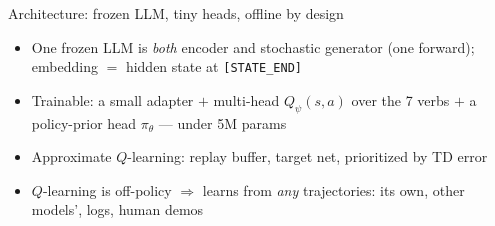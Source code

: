 \documentclass[aspectratio=169]{beamer}
\newcommand{\pitheta}{\pi_\theta}
\newcommand{\Qpsi}{Q_\psi}
\newcommand{\verbword}[1]{\texttt{#1}}
\begin{document}
\begin{frame}{Architecture: frozen LLM, tiny heads, offline by design}
  \begin{itemize}
    \item One frozen LLM is \emph{both} encoder and stochastic generator (one forward); embedding $=$ hidden state at \verbword{[STATE\_END]}
    \item Trainable: a small adapter $+$ multi-head $\Qpsi(s,a)$ over the 7 verbs $+$ a policy-prior head $\pitheta$ --- \alert{under 5M params}
    \item Approximate $Q$-learning: replay buffer, target net, prioritized by TD error
    \item $Q$-learning is \alert{off-policy} $\Rightarrow$ learns from \emph{any} trajectories: its own, other models', logs, human demos
  \end{itemize}
\end{frame}
\end{document}
